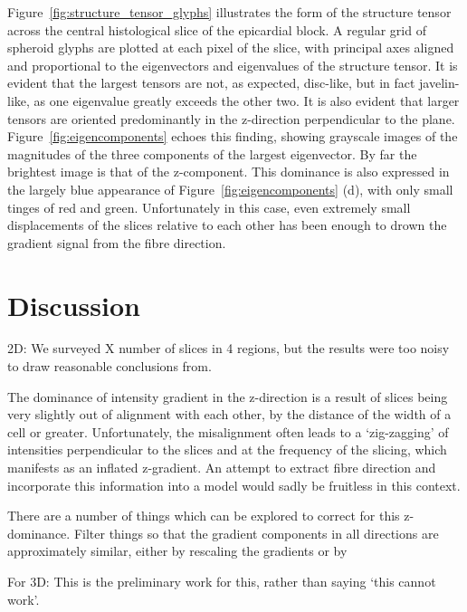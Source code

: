     Figure~\ref{fig:structure_tensor_glyphs} illustrates the form of the structure tensor across the central histological slice of the epicardial block. A regular grid of spheroid glyphs are plotted at each pixel of the slice, with principal axes aligned and proportional to the eigenvectors and eigenvalues of the structure tensor. It is evident that the largest tensors are not, as expected, disc-like, but in fact javelin-like, as one eigenvalue greatly exceeds the other two. It is also evident that larger tensors are oriented predominantly in the z-direction perpendicular to the plane. Figure~\ref{fig:eigencomponents} echoes this finding, showing grayscale images of the magnitudes of the three components of the largest eigenvector. By far the brightest image is that of the z-component. This dominance is also expressed in the largely blue appearance of Figure~\ref{fig:eigencomponents} (d), with only small tinges of red and green. Unfortunately in this case, even extremely small displacements of the slices relative to each other has been enough to drown the gradient signal from the fibre direction.
  

\section{Discussion} %
  2D: We surveyed X number of slices in 4 regions, but the results were too noisy to draw reasonable conclusions from.
  
  The dominance of intensity gradient in the z-direction is a result of slices being very slightly out of alignment with each other, by the distance of the width of a cell or greater. Unfortunately, the misalignment often leads to a `zig-zagging' of intensities perpendicular to the slices and at the frequency of the slicing, which manifests as an inflated z-gradient. An attempt to extract fibre direction and incorporate this information into a model would sadly be fruitless in this context.
  
  There are a number of things which can be explored to correct for this z-dominance. Filter things so that the gradient components in all directions are approximately similar, either by rescaling the gradients or by 
  
  For 3D: This is the preliminary work for this, rather than saying `this cannot work'.
\label{sec:discussion}
  

